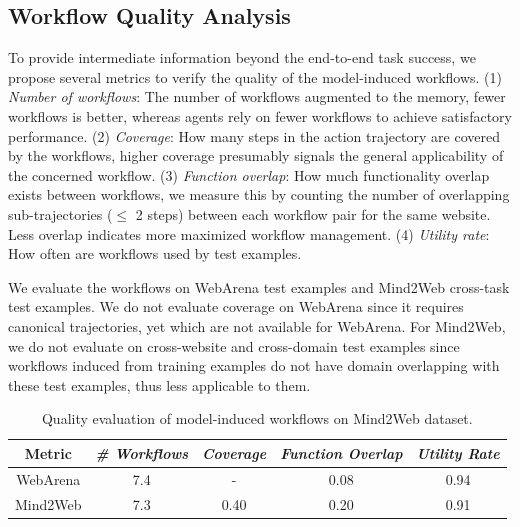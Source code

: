 \noindent{}


\subsection{Workflow Quality Analysis}

To provide intermediate information beyond the end-to-end task success, we propose several metrics to verify the quality of the model-induced workflows. 
(1) \textit{Number of workflows}: The number of workflows augmented to the memory, fewer workflows is better, whereas agents rely on fewer workflows to achieve satisfactory performance.
(2) \textit{Coverage}: How many steps in the action trajectory are covered by the workflows, higher coverage presumably signals the general applicability of the concerned workflow. 
(3) \textit{Function overlap}: How much functionality overlap exists between workflows, we measure this by counting the number of overlapping sub-trajectories ($\leq$ 2 steps) between each workflow pair for the same website. Less overlap indicates more maximized workflow management.
(4) \textit{Utility rate}: How often are workflows used by test examples.

We evaluate the workflows on WebArena test examples and Mind2Web cross-task test examples. We do not evaluate coverage on WebArena since it requires canonical trajectories, yet which are not available for WebArena.
For Mind2Web, we do not evaluate on cross-website and cross-domain test examples since workflows induced from training examples do not have domain overlapping with these test examples, thus less applicable to them.

\begin{table}[ht]
\centering
\small
\vspace{-2mm}
\caption{Quality evaluation of model-induced workflows on Mind2Web dataset.}
\vspace{2mm}
\label{tab:eval-workflow}
%
\begin{tabular}{c|cccc}
\toprule
{\bf Metric}& {\it \# Workflows} & {\it Coverage} & {\it Function Overlap} & {\it Utility Rate} \\
\midrule
{WebArena} & {7.4} & {-} & {0.08} & {0.94} \\
{Mind2Web} & {7.3} & {0.40} & {0.20} & {0.91} \\
\bottomrule
\end{tabular}
\vspace{-3mm}
\end{table}


